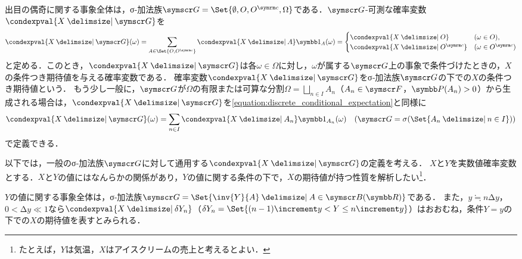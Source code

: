 \documentclass[../../main]{subfiles}
\begin{document}
出目の偶奇に関する事象全体は，σ‐加法族\(\sigmaalg{G}=\Set{\emptyset,O,\scomp{O},\Omega}\)である．\(\sigmaalg{G}\)‐可測な確率変数\(\condexpval{X\given\sigmaalg{G}}\)を
\begin{equation}
  \label{equation:discrete_conditional_expectation}
  \condexpval{X\given\sigmaalg{G}}(\omega) = \sum_{A\in\Set{O,\scomp{O}}}\condexpval{X\given A}\indicator_A(\omega)
  = \begin{cases}\condexpval{X\given O} & (\omega\in O),\\ \condexpval{X\given\scomp{O}} & (\omega\in\scomp{O})\end{cases}
\end{equation}
と定める．このとき，\(\condexpval{X\given\sigmaalg{G}}\)は各\(\omega\in\Omega\)に対し，\(\omega\)が属する\(\sigmaalg{G}\)上の事象で条件づけたときの，\(X\)の条件つき期待値を与える確率変数である．
確率変数\(\condexpval{X\given\sigmaalg{G}}\)をσ‐加法族\(\sigmaalg{G}\)の下での\(X\)の条件つき期待値という．
もう少し一般に，\(\sigmaalg{G}\)が\(\Omega\)の有限または可算な分割\(\Omega=\bigsqcup_{n\in I}A_n\)（\(A_n\in\sigmaalg{F}\)，\(\prob(A_n)>0\)）から生成される場合は，\(\condexpval{X\given\sigmaalg{G}}\)を\cref{equation:discrete_conditional_expectation}と同様に
\[
  \condexpval{X\given\sigmaalg{G}}(\omega) = \sum_{n\in I}\condexpval{X\given A_n}\indicator_{A_n}(\omega)\quad(\sigmaalg{G}=\sigmagen{\Set{A_n\given n\in I}})
\]
で定義できる．

以下では，一般のσ‐加法族\(\sigmaalg{G}\)に対して通用する\(\condexpval{X\given\sigmaalg{G}}\)の定義を考える．
\(X\)と\(Y\)を実数値確率変数とする．\(X\)と\(Y\)の値にはなんらかの関係があり，\(Y\)の値に関する条件の下で，\(X\)の期待値が持つ性質を解析したい\footnote{たとえば，\(Y\)は気温，\(X\)はアイスクリームの売上と考えるとよい．}．

\(Y\)の値に関する事象全体は，σ‐加法族\(\sigmaalg{G}=\Set{\inv{Y}{A}\given A\in\borelset{\numset{R}}}\)である．
また，\(y\fallingdotseq n\increment y\)，\(0<\increment y\ll 1\)なら\(\condexpval{X\given\delta Y_n}\)（\(\delta Y_n=\Set{(n-1)\increment y<Y\leq n\increment y}\)）はおおむね，条件\(Y=y\)の下での\(X\)の期待値を表すとみられる．
\end{document}
